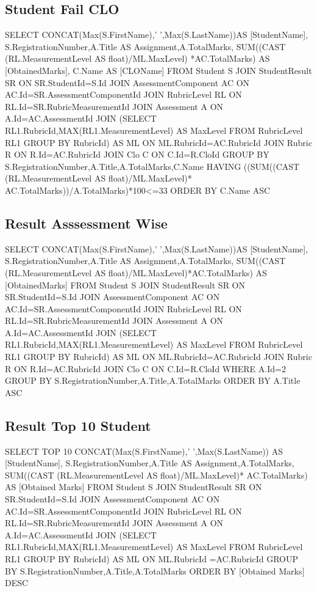 \documentclass[12pt,a4paper]{article}
\begin{document}
\subsection{Student Fail CLO}
\begin{sql}[style=sqlStyle]
SELECT CONCAT(Max(S.FirstName),' ',Max(S.LastName))AS [StudentName],
S.RegistrationNumber,A.Title AS Assignment,A.TotalMarks,
SUM((CAST (RL.MeasurementLevel AS float)/ML.MaxLevel)
*AC.TotalMarks) AS [ObtainedMarks],
C.Name AS [CLOName]
FROM Student S
JOIN StudentResult SR
ON SR.StudentId=S.Id
JOIN AssessmentComponent AC
ON AC.Id=SR.AssessmentComponentId
JOIN RubricLevel RL
ON RL.Id=SR.RubricMeasurementId
JOIN  Assessment A
ON A.Id=AC.AssessmentId
JOIN (SELECT RL1.RubricId,MAX(RL1.MeasurementLevel) AS MaxLevel
FROM RubricLevel RL1 GROUP BY RubricId) AS ML
ON ML.RubricId=AC.RubricId
JOIN Rubric R
ON R.Id=AC.RubricId
JOIN Clo C
ON C.Id=R.CloId
GROUP BY S.RegistrationNumber,A.Title,A.TotalMarks,C.Name
HAVING  ((SUM((CAST (RL.MeasurementLevel AS float)/ML.MaxLevel)*
AC.TotalMarks))/A.TotalMarks)*100<=33
ORDER BY C.Name ASC
\end{sql}
\subsection{Result Asssessment Wise}
\begin{sql}[style=sqlStyle]
SELECT CONCAT(Max(S.FirstName),' ',Max(S.LastName))AS [StudentName],
S.RegistrationNumber,A.Title AS Assignment,A.TotalMarks,
SUM((CAST (RL.MeasurementLevel AS float)/ML.MaxLevel)*AC.TotalMarks) 
AS [ObtainedMarks]
FROM Student S
JOIN StudentResult SR
ON SR.StudentId=S.Id
JOIN AssessmentComponent AC
ON AC.Id=SR.AssessmentComponentId
JOIN RubricLevel RL
ON RL.Id=SR.RubricMeasurementId
JOIN  Assessment A
ON A.Id=AC.AssessmentId
JOIN (SELECT RL1.RubricId,MAX(RL1.MeasurementLevel) AS MaxLevel 
FROM RubricLevel RL1 GROUP BY RubricId) AS ML
ON ML.RubricId=AC.RubricId
JOIN Rubric R
ON R.Id=AC.RubricId
JOIN Clo C
ON C.Id=R.CloId
WHERE A.Id=2
GROUP BY S.RegistrationNumber,A.Title,A.TotalMarks
ORDER BY  A.Title ASC
\end{sql}
\subsection{Result Top 10 Student}
\begin{sql}[style=sqlStyle]
SELECT TOP 10 CONCAT(Max(S.FirstName),' ',Max(S.LastName))
AS [StudentName],
S.RegistrationNumber,A.Title AS Assignment,A.TotalMarks,
SUM((CAST (RL.MeasurementLevel AS float)/ML.MaxLevel)*
AC.TotalMarks) AS [Obtained Marks]
FROM Student S
JOIN StudentResult SR
ON SR.StudentId=S.Id
JOIN AssessmentComponent AC
ON AC.Id=SR.AssessmentComponentId
JOIN RubricLevel RL
ON RL.Id=SR.RubricMeasurementId
JOIN  Assessment A
ON A.Id=AC.AssessmentId
JOIN (SELECT RL1.RubricId,MAX(RL1.MeasurementLevel) AS MaxLevel 
FROM RubricLevel RL1 GROUP BY RubricId) AS ML
ON ML.RubricId
=AC.RubricId
GROUP BY S.RegistrationNumber,A.Title,A.TotalMarks
ORDER BY [Obtained Marks] DESC
\end{sql}
\end{document}
